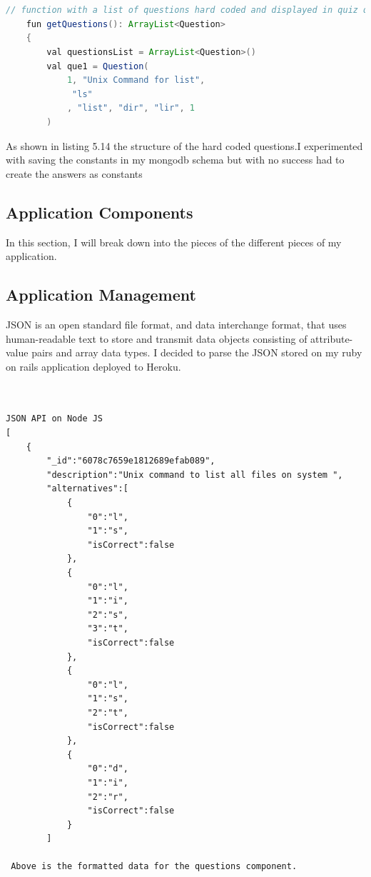 \begin{lstlisting}[language=Java, caption= Hard  Coded Questions]


// function with a list of questions hard coded and displayed in quiz questions activity
    fun getQuestions(): ArrayList<Question>
    {
        val questionsList = ArrayList<Question>()
        val que1 = Question(
            1, "Unix Command for list",
             "ls"
            , "list", "dir", "lir", 1
        )
\end{lstlisting}

As shown in listing 5.14 the structure of the hard coded questions.I experimented with saving the constants in my mongodb schema but with no success had to create the answers as constants



\subsection{Application Components  }
In this section, I will break down into the pieces of the different pieces of my application.

\subsection{Application   Management }

JSON is an open standard file format, and data interchange format, that uses human-readable text to store and transmit data objects consisting of attribute-value pairs and array data types. I decided to parse the JSON stored on my ruby on rails application deployed to Heroku.


\begin{verbatim}


JSON API on Node JS 
[
    {
        "_id":"6078c7659e1812689efab089",
        "description":"Unix command to list all files on system ",
        "alternatives":[
            {
                "0":"l",
                "1":"s",
                "isCorrect":false
            },
            {
                "0":"l",
                "1":"i",
                "2":"s",
                "3":"t",
                "isCorrect":false
            },
            {
                "0":"l",
                "1":"s",
                "2":"t",
                "isCorrect":false
            },
            {
                "0":"d",
                "1":"i",
                "2":"r",
                "isCorrect":false
            }
        ]
        
 Above is the formatted data for the questions component.

\end{verbatim}

